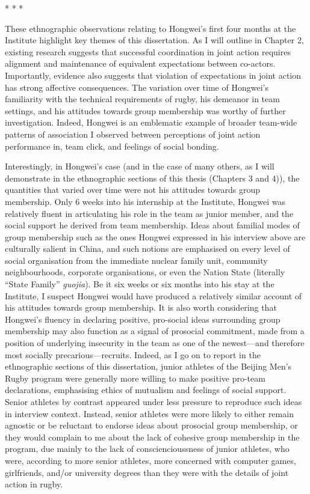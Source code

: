 \begin{center}
  * * *
\end{center}

These ethnographic observations relating to Hongwei's first four months at the Institute highlight key themes of this dissertation.  As I will outline in Chapter 2, existing research suggests that successful coordination in joint action requires alignment and maintenance of equivalent expectations between co-actors.  Importantly, evidence also suggests that violation of expectations in joint action has strong affective consequences.  The variation over time of Hongwei's familiarity with the technical requirements of rugby, his demeanor in team settings, and his attitudes towards group membership was worthy of further investigation.  Indeed, Hongwei is an emblematic example of broader team-wide patterns of association I observed between perceptions of joint action performance in, team click, and feelings of social bonding.

Interestingly, in Hongwei's case (and in the case of many others, as I will demonstrate in the ethnographic sections of this thesis (Chapters 3 and 4)), the quantities that varied over time were not his attitudes towards group membership.  Only 6 weeks into his internship at the Institute, Hongwei was relatively fluent in articulating his role in the team as junior member, and the social support he derived from team membership.  Ideas about familial modes of group membership such as the ones Hongwei expressed in his interview above are culturally salient in China, and such notions are emphasised on every level of social organisation from the immediate nuclear family unit, community neighbourhoods, corporate organisations, or even the Nation State (literally ``State Family'' \textit{guojia}). Be it six weeks or six months into his stay at the Institute, I suspect Hongwei would have produced a relatively similar account of his attitudes towards group membership.  It is also worth considering that Hongwei's fluency in declaring positive, pro-social ideas surrounding group membership may also function as a  signal of prosocial commitment, made from a position of underlying insecurity in the team as one of the newest---and therefore most socially precarious---recruits.  Indeed, as I go on to report in the ethnographic sections of this dissertation, junior athletes of the Beijing Men's Rugby program were generally more willing to make positive pro-team declarations, emphasising ethics of mutualism and feelings of social support. Senior athletes by contrast appeared under less pressure to reproduce such ideas in interview context. Instead, senior athletes were more likely to either remain agnostic or be reluctant to endorse ideas about prosocial group membership, or they would complain to me about the lack of cohesive group membership in the program, due mainly to the lack of consciencioussness of junior athletes, who were, according to more senior athletes, more concerned with computer games, girlfriends, and/or university degrees than they were with the details of joint action in rugby.

